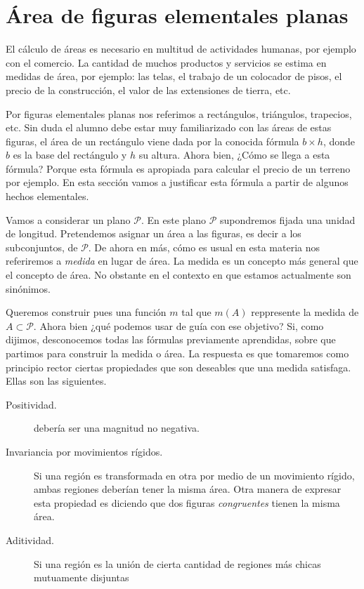 \section{Área de figuras elementales planas}\label{sec:area_elem}

  
El cálculo de áreas es necesario en multitud de actividades humanas, por ejemplo con el comercio. La cantidad de muchos productos y servicios se estima en medidas de área, por ejemplo: las telas,  el trabajo de un colocador de pisos,  el precio de la construcción,  el valor de las extensiones de tierra, etc.  
 
 


Por figuras elementales planas nos referimos a rectángulos, triángulos, trapecios, etc. Sin duda el alumno  debe estar  muy familiarizado con las áreas de estas figuras, el área de un rectángulo viene dada por la conocida fórmula $b\times h$, donde $b$ es la base del rectángulo y $h$ su altura.  Ahora bien, ¿Cómo 
se llega a esta fórmula? Porque esta fórmula es apropiada para calcular el precio de un terreno por ejemplo. En esta sección vamos a justificar esta fórmula a partir de algunos hechos elementales.



Vamos a considerar un plano $\mathcal{P}$. En este plano $\mathcal{P}$ supondremos fijada una unidad de longitud.  Pretendemos asignar un área a las figuras, es decir a los subconjuntos, de $\mathcal{P}$. De ahora en más, cómo es usual en esta materia  nos referiremos a \emph{medida} en lugar de área. La medida es un concepto más general  que el concepto de área. No obstante en el contexto en que estamos actualmente son sinónimos.  

Queremos construir pues una función $m$ tal que $m(A)$ reppresente la medida  de  $A\subset\mathcal{P}$. Ahora bien ¿qué podemos usar de guía con ese objetivo? Si, como dijimos,  desconocemos todas las fórmulas previamente aprendidas, sobre que partimos para construir la medida o área. La respuesta es que tomaremos como principio rector  ciertas propiedades que son deseables  que una medida satisfaga. Ellas son las  siguientes. 




\begin{description}
 \item[Positividad.] debería ser una magnitud no negativa.  
 \item[Invariancia por movimientos rígidos.] Si una región es transformada en otra por medio de un movimiento rígido, ambas regiones deberían tener la misma área. Otra manera de expresar esta propiedad es diciendo que dos figuras \emph{congruentes} tienen la misma área. 
 \item[Aditividad.] Si una región es la unión de cierta cantidad de regiones más chicas mutuamente disjuntas  
\end{description}

